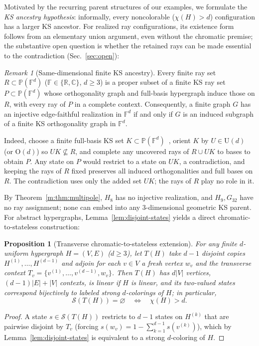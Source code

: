 \documentclass[aps,pra,reprint,superscriptaddress,longbibliography,nofootinbib,floatfix,10pt]{revtex4-2}
\newtheorem{proposition}[theorem]{Proposition}
\theoremstyle{definition}\newtheorem{definition}[theorem]{Definition}
\theoremstyle{remark}\newtheorem{remark}[theorem]{Remark}
\newcommand{\C}{\mathbb C}\newcommand{\R}{\mathbb R}\newcommand{\Q}{\mathbb Q}
\newcommand{\F}{\mathbb F}\newcommand{\Z}{\mathbb Z}\newcommand{\PP}{\mathbb P}
\newcommand{\Sc}{\mathcal S}\newcommand{\Cc}{\mathcal C}
\begin{document}
Motivated by the recurring parent structures of our examples, we formulate the \emph{KS ancestry hypothesis}: informally, every noncolorable ($\chi(H)>d$) configuration has a larger KS ancestor. For realized ray configurations, its existence form follows from an elementary union argument, even without the chromatic premise; the substantive open question is whether the retained rays can be made essential to the contradiction (Sec.~\ref{sec:open}):

\begin{remark}[Same-dimensional finite KS ancestry]\label{prop:ks-ancestry}
Every finite ray set $R\subset\PP(\F^d)$ ($\F\in\{\R,\C\}$, $d\ge3$) is a proper subset of a finite KS ray set $P\subset\PP(\F^d)$ whose orthogonality graph and full-basis hypergraph induce those on $R$, with every ray of $P$ in a complete context. Consequently, a finite graph $G$ has an injective edge-faithful realization in $\F^d$ if and only if $G$ is an induced subgraph of a finite KS orthogonality graph in $\F^d$.

Indeed, choose a finite full-basis KS set $K\subset\PP(\F^d)$~\cite{kochen1,cabello2005recursive}, orient $K$ by $U\in\mathrm{U}(d)$ (or $\mathrm{O}(d)$) so $UK\not\subseteq R$, and complete any uncovered rays of $R\cup UK$ to bases to obtain $P$. Any state on $P$ would restrict to a state on $UK$, a contradiction, and keeping the rays of $R$ fixed preserves all induced orthogonalities and full bases on $R$. The contradiction uses only the added set $UK$; the rays of $R$ play no role in it.
\end{remark}

By Theorem~\ref{m:thm:multipole}, $H_8$ has no injective realization, and $H_9,G_{32}$ have no ray assignment; none can embed into any $3$-dimensional geometric KS parent. For abstract hypergraphs, Lemma~\ref{lem:disjoint-states} yields a direct chromatic-to-stateless construction:

\begin{proposition}[Transverse chromatic-to-stateless extension]\label{prop:transverse}
For any finite $d$-uniform hypergraph $H=(V,E)$ ($d\ge3$), let $T(H)$ take $d-1$ disjoint copies $H^{(1)},\ldots,H^{(d-1)}$ and adjoin for each $v\in V$ a fresh vertex $w_v$ and the transverse context $T_v=\{v^{(1)},\ldots,v^{(d-1)},w_v\}$. Then $T(H)$ has $d|V|$ vertices, $(d-1)|E|+|V|$ contexts, is linear if $H$ is linear, and its two-valued states correspond bijectively to labeled strong $d$-colorings of $H$; in particular,
\begin{equation}\label{eq:transverse-equivalence}
\Sc(T(H))=\varnothing \quad\Longleftrightarrow\quad \chi(H)>d.
\end{equation}
\end{proposition}
\begin{proof}
A state $s\in\Sc(T(H))$ restricts to $d-1$ states on $H^{(k)}$ that are pairwise disjoint by $T_v$ (forcing $s(w_v)=1-\sum_{k=1}^{d-1}s(v^{(k)})$), which by Lemma~\ref{lem:disjoint-states} is equivalent to a strong $d$-coloring of $H$.
\end{proof}
\end{document}
